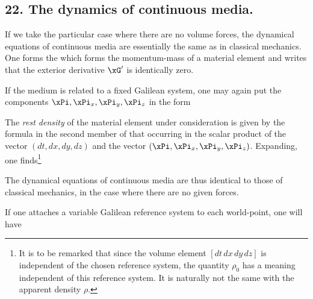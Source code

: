 \subsection*{22. The dynamics of continuous media.}

If we take the particular case where there are no volume forces, the dynamical equations of continuous media are essentially the same as in classical mechanics. One forms the  which forms the momentum-mass of a material element
and writes that the exterior derivative $\xG'$ is identically zero.

If the medium is related to a fixed Galilean system, one may again put the components $\xPi, \xPi_x, \xPi_y, \xPi_z$ in the form

The \textit{rest density} of the material element under consideration is given by
the formula in the second member of that occurring in the scalar product of the vector $(dt, dx, dy, dz)$ and the vector $(\xPi, \xPi_x, \xPi_y, \xPi_z)$. Expanding, one finds\footnote{It is to be remarked that since the volume element $[dt\,dx\,dy\,dz]$ is independent of the chosen reference system, the quantity $\rho_0$ has a meaning independent of this reference system. It is naturally not the same with the apparent density $\rho$.}

The dynamical equations of continuous media are thus identical to those of classical mechanics, in the case where there are no given forces.

If one attaches a variable Galilean reference system to each world-point, one will have
